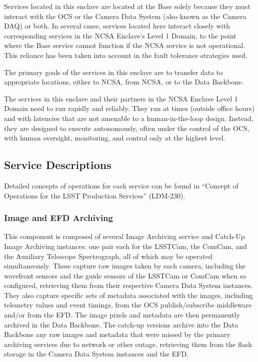 \documentclass[DM,lsstdraft,toc]{lsstdoc}
\begin{document}
Services located in this enclave are located at the Base solely because
they must interact with the OCS or the Camera Data System (also known as
the Camera DAQ) or both. In several cases, services located here
interact closely with corresponding services in the NCSA Enclave's Level
1 Domain, to the point where the Base service cannot function if the
NCSA service is not operational. This reliance has been taken into
account in the fault tolerance strategies used.

The primary goals of the services in this enclave are to transfer data
to appropriate locations, either to NCSA, from NCSA, or to the Data
Backbone.

The services in this enclave and their partners in the NCSA Enclave
Level 1 Domain need to run rapidly and reliably. They run at times
(outside office hours) and with latencies that are not amenable to a
human-in-the-loop design. Instead, they are designed to execute
autonomously, often under the control of the OCS, with human oversight,
monitoring, and control only at the highest level.

\subsection{Service Descriptions}\label{service-descriptions}

Detailed concepts of operations for each service can be found in
``Concept of Operations for the LSST Production Services'' (LDM-230).

\subsubsection{Image and EFD Archiving}\label{image-and-efd-archiving}

This component is composed of several Image Archiving service and
Catch-Up Image Archiving instances: one pair each for the LSSTCam, the
ComCam, and the Auxiliary Telescope Spectrograph, all of which may be
operated simultaneously. These capture raw images taken by each camera,
including the wavefront sensors and the guide sensors of the LSSTCam or
ComCam when so configured, retrieving them from their respective Camera
Data System instances. They also capture specific sets of metadata
associated with the images, including telemetry values and event
timings, from the OCS publish/subscribe middleware and/or from the EFD.
The image pixels and metadata are then permanently archived in the Data
Backbone. The catch-up versions archive into the Data Backbone any raw
images and metadata that were missed by the primary archiving services
due to network or other outage, retrieving them from the flash storage
in the Camera Data System instances and the EFD.
\end{document}
